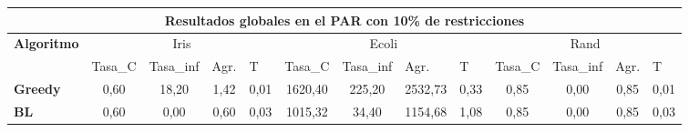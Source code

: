 \documentclass[12pt, spanish]{article}
\begin{document}
\begin{table}[H]
\small
\begin{adjustwidth}{-1cm}{-1cm}%


\begin{tabular}{|c|c|c|c|c|c|c|c|c|c|c|c|c|}
\hline
\multicolumn{13}{|c|}{\textbf{Resultados globales en el PAR con 10\% de restricciones}}                                                                                                                                                                                                                                                                                                              \\ \hline
\multirow{2}{*}{\textbf{Algoritmo}}   & \multicolumn{4}{c|}{Iris}                                                                                          & \multicolumn{4}{c|}{Ecoli}                                                                                         & \multicolumn{4}{c|}{Rand}                                                                                          \\ \cline{2-13} 
                                      & \multicolumn{1}{l|}{Tasa\_C} & \multicolumn{1}{l|}{Tasa\_inf} & \multicolumn{1}{l|}{Agr.} & \multicolumn{1}{l|}{T} & \multicolumn{1}{l|}{Tasa\_C} & \multicolumn{1}{l|}{Tasa\_inf} & \multicolumn{1}{l|}{Agr.} & \multicolumn{1}{l|}{T} & \multicolumn{1}{l|}{Tasa\_C} & \multicolumn{1}{l|}{Tasa\_inf} & \multicolumn{1}{l|}{Agr.} & \multicolumn{1}{l|}{T} \\ \hline
\multicolumn{1}{|l|}{\textbf{Greedy}} & 0,60                         & 18,20                          & 1,42                      & 0,01                   & 1620,40                      & 225,20                         & 2532,73                   & 0,33                   & 0,85                         & 0,00                           & 0,85                      & 0,01                   \\ \hline
\multicolumn{1}{|l|}{\textbf{BL}}     & 0,60                         & 0,00                           & 0,60                      & 0,03                   & 1015,32                      & 34,40                          & 1154,68                   & 1,08                   & 0,85                         & 0,00                           & 0,85                      & 0,03                   \\ \hline
\end{tabular}

\end{adjustwidth}
\end{table}
\end{document}
